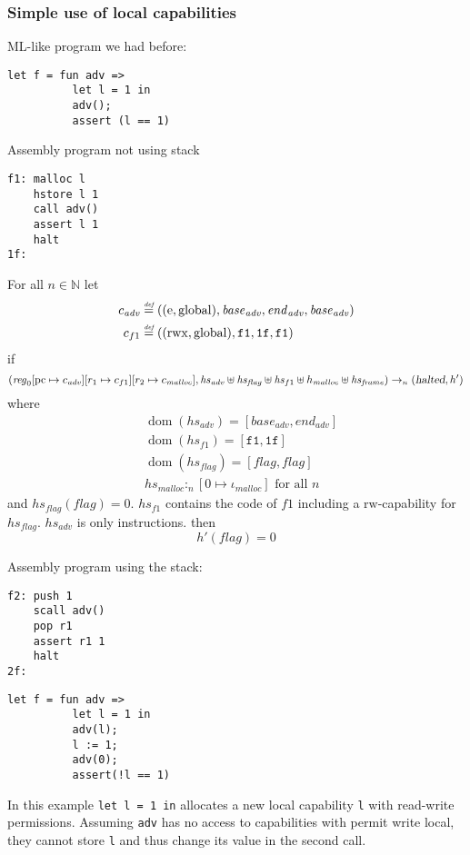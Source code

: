 \documentclass[a4paper]{article}
\newcommand{\update}[2]{[#1 \mapsto #2]}
\newcommand{\defeq}{\stackrel{\textit{\tiny{def}}}{=}}
\DeclareMathOperator{\dom}{dom}
\newcommand{\var}[1]{\mathit{#1}}
\newcommand{\hs}{\var{hs}}
\newcommand{\pcreg}{\mathrm{pc}}
\newcommand{\start}{\var{base}}
\newcommand{\addrend}{\var{end}}
\newcommand{\reg}{\var{reg}}
\newcommand{\heap}{\var{heap}}
\newcommand{\adv}{\var{adv}}
\newcommand{\flag}{\var{flag}}
\newcommand{\halted}{\textsl{halted}}
\newcommand{\heapSat}[3][\heap]{#1 :_{#2} #3}
\newcommand{\codelabel}[1]{\mathit{#1}}
\newcommand{\malloc}{\codelabel{malloc}}
\newcommand{\nats}{\mathbb{N}}
\newcommand{\plainperm}[1]{\mathrm{#1}}
\newcommand{\readwrite}{\plainperm{rw}}
\newcommand{\entry}{\plainperm{e}}
\newcommand{\rwx}{\plainperm{rwx}}
\newcommand{\glob}{\plainperm{global}}
\newcommand{\step}[1][]{\rightarrow_{#1}}
\begin{document}
\subsubsection{Simple use of local capabilities}
ML-like program we had before:
\begin{verbatim}
let f = fun adv =>
          let l = 1 in
          adv();
          assert (l == 1)
\end{verbatim}
Assembly program not using stack
\begin{verbatim}
f1: malloc l
    hstore l 1
    call adv()
    assert l 1
    halt
1f:
\end{verbatim}
\begin{lemma}
  For all $n \in \nats$
  let
  \begin{align*}
    c_{\var{adv}} & \defeq ((\entry,\glob),\start_{\adv},\addrend_{\adv},\start_{\adv}) \\
    c_{f1} & \defeq ((\rwx,\glob),\mathtt{f1},\mathtt{1f},\mathtt{f1}) \\
  \end{align*}
if 
  \[
    (\reg_0\update{\pcreg}{c_{\adv}}
          \update{r_1}{c_{f1}}\update{r_2}{c_\malloc},\hs_\adv \uplus \hs_\flag \uplus \hs_{f1} \uplus h_{\malloc} \uplus \hs_{\var{frame}}) \step[n] (\halted,h')
  \]
where 
\begin{align*}
  &\dom(\hs_{\adv}) = [\start_\adv,\addrend_\adv] \\
  &\dom(\hs_{f1}) = [\mathtt{f1},\mathtt{1f}] \\
  &\dom(\hs_\flag) = [\flag,\flag] \\
  &\heapSat[\hs_{\malloc}]{n}{[0 \mapsto \iota_{\malloc}]} \text{ for all } n
\end{align*}
and $hs_\flag(\flag) = 0$. $hs_{f1}$ contains the code of $f1$ including a $\readwrite$-capability for $\hs_\flag$. $\hs_\adv$ is only instructions.
then
\[
  h'(\flag) = 0
\]  
\end{lemma}

Assembly program using the stack:
\begin{verbatim}
f2: push 1
    scall adv()
    pop r1
    assert r1 1
    halt
2f:
\end{verbatim}

\begin{verbatim}
let f = fun adv =>
          let l = 1 in
          adv(l);
          l := 1;
          adv(0);
          assert(!l == 1)
\end{verbatim}
In this example \texttt{let l = 1 in} allocates a new local capability \texttt{l} with read-write permissions. Assuming \texttt{adv} has no access to capabilities with permit write local, they cannot store \texttt{l} and thus change its value in the second call.
\end{document}
